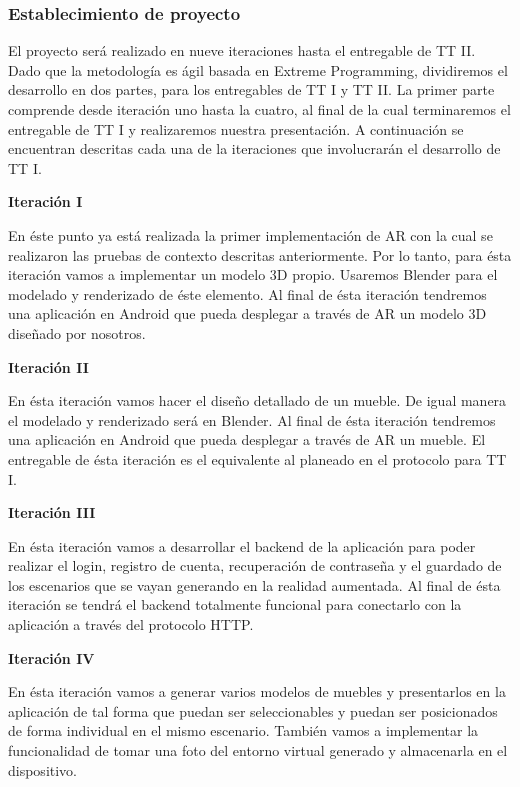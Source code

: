 \subsubsection{Establecimiento de proyecto}
El proyecto será realizado en nueve iteraciones hasta el entregable de TT II. Dado que la metodología es ágil basada en Extreme Programming, dividiremos el desarrollo en dos partes, para los entregables de TT I y TT II. La primer parte comprende desde iteración uno hasta la cuatro, al final de la cual terminaremos el entregable de TT I y realizaremos nuestra presentación. A continuación se encuentran descritas cada una de la iteraciones que involucrarán el desarrollo de TT I.\par

\textbf{Iteración I} \par
En éste punto ya está realizada la primer implementación de AR con la cual se realizaron las pruebas de contexto descritas anteriormente. Por lo tanto, para ésta iteración vamos a implementar un modelo 3D propio. Usaremos Blender para el modelado y renderizado de éste elemento. Al final de ésta iteración tendremos una aplicación en Android que pueda desplegar a través de AR un modelo 3D diseñado por nosotros.

\textbf{Iteración II} \par
En ésta iteración vamos hacer el diseño detallado de un mueble. De igual manera el modelado y renderizado será en Blender. Al final de ésta iteración tendremos una aplicación en Android que pueda desplegar a través de AR un mueble. El entregable de ésta iteración es el equivalente al planeado en el protocolo para TT I.

\textbf{Iteración III} \par
En ésta iteración vamos a desarrollar el backend de la aplicación para poder realizar el login, registro de cuenta, recuperación de contraseña y el guardado de los escenarios que se vayan generando en la realidad aumentada. Al final de ésta iteración se tendrá el backend totalmente funcional para conectarlo con la aplicación a través del protocolo HTTP.

\textbf{Iteración IV} \par
En ésta iteración vamos a generar varios modelos de muebles y presentarlos en la aplicación de tal forma que puedan ser seleccionables y puedan ser posicionados de forma individual en el mismo escenario. También vamos a implementar la funcionalidad de tomar una foto del entorno virtual generado y almacenarla en el dispositivo.




